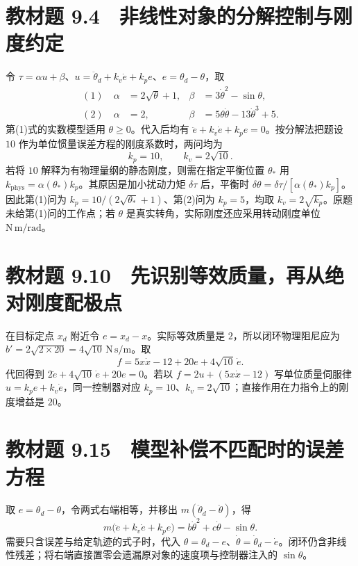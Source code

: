 \section*{教材题 9.4　非线性对象的分解控制与刚度约定}
\label{hw:control-9-4}
令 $\tau=\alpha u+\beta$、$u=\ddot\theta_d+k_v\dot e+k_pe$、$e=\theta_d-\theta$，取
\[
 \begin{aligned}
  (1)\quad \alpha&=2\sqrt\theta+1,&\beta&=3\dot\theta^2-\sin\theta,\\
  (2)\quad \alpha&=2,&\beta&=5\theta\dot\theta-13\dot\theta^3+5.
 \end{aligned}
\]
第(1)式的实数模型适用 $\theta\ge0$。代入后均有 $\ddot e+k_v\dot e+k_pe=0$。按分解法把题设 $10$ 作为单位惯量误差方程的刚度系数时，两问均为
\[
 k_p=10,\qquad k_v=2\sqrt{10}.
\]
若将 $10$ 解释为有物理量纲的静态刚度，则需在指定平衡位置 $\theta_*$ 用 $k_{\mathrm{phys}}=\alpha(\theta_*)k_p$。其原因是加小扰动力矩 $\delta\tau$ 后，平衡时 $\delta\theta=\delta\tau/[\alpha(\theta_*)k_p]$。因此第(1)问为 $k_p=10/(2\sqrt{\theta_*}+1)$、第(2)问为 $k_p=5$，均取 $k_v=2\sqrt{k_p}$。原题未给第(1)问的工作点；若 $\theta$ 是真实转角，实际刚度还应采用转动刚度单位 $\mathrm{N\,m/rad}$。

\section*{教材题 9.10　先识别等效质量，再从绝对刚度配极点}
\label{hw:control-9-10}
在目标定点 $x_d$ 附近令 $e=x_d-x$。实际等效质量是 $2$，所以闭环物理阻尼应为 $b'=2\sqrt{2\times20}=4\sqrt{10}\,\mathrm{N\,s/m}$。取
\[
 f=5x\dot x-12+20e+4\sqrt{10}\,\dot e.
\]
代回得到 $2\ddot e+4\sqrt{10}\,\dot e+20e=0$。若以 $f=2u+(5x\dot x-12)$ 写单位质量伺服律 $u=k_pe+k_v\dot e$，同一控制器对应 $k_p=10$、$k_v=2\sqrt{10}$；直接作用在力指令上的刚度增益是 $20$。

\section*{教材题 9.15　模型补偿不匹配时的误差方程}
\label{hw:control-9-15}
取 $e=\theta_d-\theta$，令两式右端相等，并移出 $m(\ddot\theta_d-\ddot\theta)$，得
\[
 m\bigl(\ddot e+k_v\dot e+k_pe\bigr)=b\dot\theta^2+c\dot\theta-\sin\theta.
\]
需要只含误差与给定轨迹的式子时，代入 $\theta=\theta_d-e$、$\dot\theta=\dot\theta_d-\dot e$。闭环仍含非线性残差；将右端直接置零会遗漏原对象的速度项与控制器注入的 $\sin\theta$。

